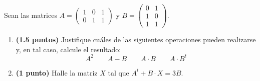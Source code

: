 
Sean las matrices $A=\begin{pmatrix}1&0&1\\0&1&1\end{pmatrix}$ y $B=\begin{pmatrix}0&1\\1&0\\1&1\end{pmatrix}$.
\begin{enumerate}[label=\alph*)]
\item \textbf{(1.5 puntos)} Justifique cuáles de las siguientes operaciones pueden realizarse y, en tal caso, calcule el resultado:
\[
A^2\qquad A-B\qquad A\cdot B\qquad A\cdot B^t
\]
\item \textbf{(1 punto)} Halle la matriz $X$ tal que $A^t+B\cdot X=3B$.
\end{enumerate}
